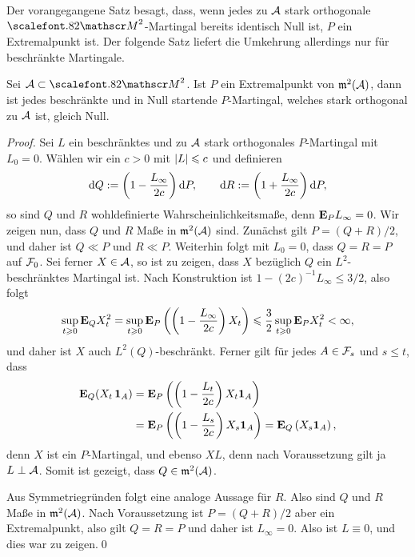Der vorangegangene Satz besagt, dass, wenn jedes zu $\AA$ stark orthogonale
$\MM^2$-Martingal bereits identisch Null ist, $P$ ein Extremalpunkt ist. Der
folgende Satz liefert die Umkehrung allerdings nur für beschränkte Martingale.

\begin{theorem}
\label{prop:5.5}
Sei $\AA\subset\MM^2$. Ist $P$ ein Extremalpunkt von $\m^2(\AA)$, dann ist
jedes beschränkte und in Null startende $P$-Martingal, welches stark orthogonal
zu $\AA$ ist, gleich Null.\fish
\end{theorem}
\begin{proof}
Sei $L$ ein beschränktes und zu $\AA$ stark orthogonales $P$-Martingal mit $L_0
= 0$. Wählen wir ein $c > 0$ mit $\abs{L}\le c$ und definieren
\begin{align*}
\dQ \defl \left(1-\frac{L_\infty}{2c} \right)\dP,\qquad
\dR \defl \left(1+\frac{L_\infty}{2c} \right)\dP,
\end{align*}
so sind $Q$ und $R$ wohldefinierte Wahrscheinlichkeitsmaße, denn $\E_PL_\infty =
0$. Wir zeigen nun, dass $Q$ und $R$ Maße in $\m^2(\AA)$ sind. Zunächst gilt $P
= (Q+R)/2$, und daher ist $Q\ll P$ und $R\ll P$. Weiterhin folgt mit $L_0 =
0$, dass $Q=R=P$ auf $\FF_0$. Sei ferner $X\in\AA$, so ist zu zeigen, dass $X$
bezüglich $Q$ ein $L^2$-beschränktes Martingal ist. Nach Konstruktion ist
$1-(2c)^{-1}L_\infty \le 3/2$, also folgt
\begin{align*}
\sup_{t\ge 0} \E_Q X_t^2 = 
\sup_{t\ge 0} \E_P \left(\left(1- \frac{L_\infty}{2c} \right)X_t\right)
\le \frac{3}{2} \sup_{t\ge 0} \E_P X_t^2 < \infty,
\end{align*}
und daher ist $X$ auch $L^2(Q)$-beschränkt. Ferner gilt für jedes
$A\in\FF_s$ und $s\le t$, dass
\begin{align*}
\E_Q (X_t\, \Id_A)
&= \E_P \left(\left(1-\frac{L_t}{2c}\right)X_t \Id_A \right)\\
&= \E_P \left(\left(1-\frac{L_s}{2c}\right)X_s \Id_A \right)=
\E_Q \left(X_s \Id_A \right),
\end{align*}
denn $X$ ist ein $P$-Martingal, und ebenso $XL$, denn nach Voraussetzung gilt ja
$L\perp \AA$. Somit ist gezeigt, dass $Q\in\m^2(\AA)$.

Aus Symmetriegründen folgt eine analoge Aussage für $R$. Also sind $Q$ und $R$
Maße in $\m^2(\AA)$. Nach Voraussetzung ist $P = (Q+R)/2$ aber ein
Extremalpunkt, also gilt $Q=R=P$ und daher ist $L_\infty = 0$. Also ist
$L\equiv 0$, und dies war zu zeigen.\qed
\end{proof}

